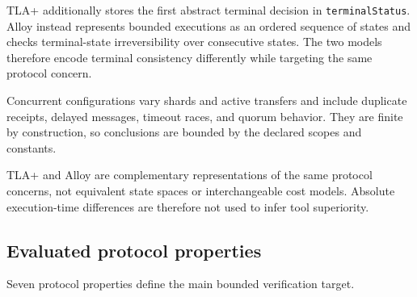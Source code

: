 TLA+ additionally stores the first abstract terminal decision in
\texttt{terminalStatus}. Alloy instead represents bounded executions as an
ordered sequence of states and checks terminal-state irreversibility over
consecutive states. The two models therefore encode terminal consistency
differently while targeting the same protocol concern.

Concurrent configurations vary shards and active transfers and include
duplicate receipts, delayed messages, timeout races, and quorum behavior. They
are finite by construction, so conclusions are bounded by the declared scopes
and constants.

TLA+ and Alloy are complementary representations of the same protocol concerns,
not equivalent state spaces or interchangeable cost models. Absolute
execution-time differences are therefore not used to infer tool superiority.

\subsection{Evaluated protocol properties}
\label{subsec:properties}

Seven protocol properties define the main bounded verification target.

